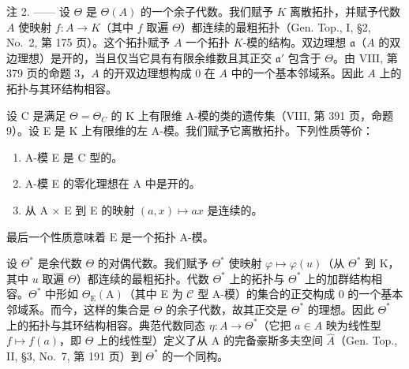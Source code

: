 注 2. —— 设 \(\Theta\) 是 \(\Theta(A)\) 的一个余子代数。我们赋予 \(K\) 离散拓扑，并赋予代数 \(A\) 使映射 \(f: A \to K\)（其中 \(f\) 取遍 \(\Theta\)）都连续的最粗拓扑（Gen. Top., I, §2, No.~2, 第 175 页）。这个拓扑赋予 \(A\) 一个拓扑 \(K\)-模的结构。双边理想 \(\mathfrak{a}\)（\(A\) 的双边理想）是开的，当且仅当它具有有限余维数且其正交 \(\mathfrak{a}'\) 包含于 \(\Theta\)。由 VIII, 第 379 页的命题 3，\(A\) 的开双边理想构成 \(0\) 在 \(A\) 中的一个基本邻域系。因此 \(A\) 上的拓扑与其环结构相容。

设 C 是满足 \(\Theta = \Theta_{C}\) 的 K 上有限维 A-模的类的遗传集（VIII, 第 391 页，命题 9）。设 E 是 K 上有限维的左 A-模。我们赋予它离散拓扑。下列性质等价：

\begin{enumerate}
\def\labelenumi{(\roman{enumi})}
\item
  A-模 E 是 C 型的。
\item
  A-模 E 的零化理想在 A 中是开的。
\item
  从 A × E 到 E 的映射 \((a, x) \mapsto ax\) 是连续的。
\end{enumerate}

最后一个性质意味着 \(\mathrm{E}\) 是一个拓扑 A-模。

设 \(\Theta^{*}\) 是余代数 \(\Theta\) 的对偶代数。我们赋予 \(\Theta^{*}\) 使映射 \(\varphi \mapsto \varphi(u)\)（从 \(\Theta^{*}\) 到 K，其中 \(u\) 取遍 \(\Theta\)）都连续的最粗拓扑。代数 \(\Theta^{*}\) 上的拓扑与 \(\Theta^{*}\) 上的加群结构相容。\(\Theta^{*}\) 中形如 \(\Theta_{\mathrm{E}}(\mathrm{A})\)（其中 E 为 \(\mathcal{C}\) 型 A-模）的集合的正交构成 0 的一个基本邻域系。而今，这样的集合是 \(\Theta\) 的余子代数，故其正交是 \(\Theta^{*}\) 的理想。因此 \(\Theta^{*}\) 上的拓扑与其环结构相容。典范代数同态 \(\eta: A \to \Theta^{*}\)（它把 \(a \in A\) 映为线性型 \(f \mapsto f(a)\)，即 \(\Theta\) 上的线性型）定义了从 A 的完备豪斯多夫空间 \(\widehat{A}\)（Gen. Top., II, §3, No.~7, 第 191 页）到 \(\Theta^{*}\) 的一个同构。

